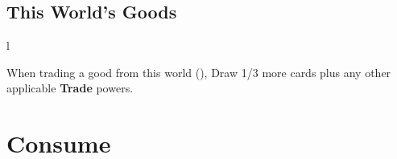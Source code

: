 \documentclass[letterpaper,landscape,twocolumn,8pt]{extarticle}
\newcommand{\inline}[1]{\scalerel*{#1}{M}}
\begin{document}
\begin{minipage}[t]{\calc{1/3}\columnwidth}
\subsection*{This World's Goods}

\setlength{\intextsep}{0pt}%

\begin{wrapfigure}{l}{\columnwidth}
    
    
\end{wrapfigure}

When trading a good from this world
(\inline{}), Draw 1/3 more
cards plus any other applicable \textbf{Trade} powers.
\end{minipage}

\pagebreak{}
\section{Consume}%
\end{document}
